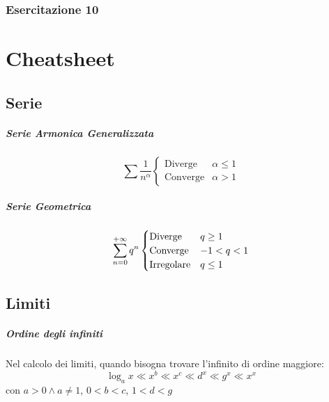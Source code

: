 \documentclass[12pt, a4paper, openany]{book}
\begin{document}
\subsection{Esercitazione 10}

\chapter{Cheatsheet}
\section*{Serie}
\paragraph*{Serie Armonica Generalizzata}
\begin{equation*}
	\sum \frac{1}{n^\alpha} \begin{cases}
		\text{Diverge}  & \alpha\leq 1 \\
		\text{Converge} & \alpha> 1
	\end{cases}
\end{equation*}
\paragraph*{Serie Geometrica}
\begin{equation*}
	\sum_{n=0}^{+\infty} q^n \begin{cases}
		\text{Diverge}    & q\geq 1 \\
		\text{Converge}   & -1<q<1  \\
		\text{Irregolare} & q\leq 1
	\end{cases}
\end{equation*}
\section*{Limiti}
\paragraph*{Ordine degli infiniti}
Nel calcolo dei limiti, quando bisogna trovare l'infinito di ordine maggiore:
$$ \log_ax\ll x^b\ll x^c\ll d^x\ll g^x\ll x^x $$
con $a>0 \wedge a\neq 1$, $0<b<c$, $1<d<g$
\end{document}
